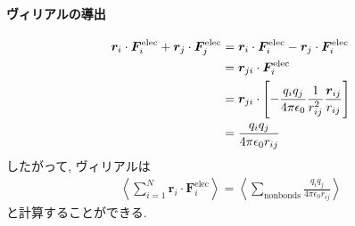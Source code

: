 \paragraph{ヴィリアルの導出}

\begin{align}
    \bm{r}_{i} \cdot \bm{F}_{i}^{\mathrm{elec}}
   +\bm{r}_{j} \cdot \bm{F}_{j}^{\mathrm{elec}}
 &=
    \bm{r}_{i} \cdot \bm{F}_{i}^{\mathrm{elec}}
   -\bm{r}_{j} \cdot \bm{F}_{i}^{\mathrm{elec}}
 \notag
 \\
 &=
    \bm{r}_{ji} \cdot \bm{F}_{i}^{\mathrm{elec}}
 \notag
 \\
 &=
    \bm{r}_{ji} \cdot
    \left[
          -\frac{q_{i}q_{j}}{4 \pi \epsilon_{0}}
           \frac{1}{r_{ij}^{2}}
           \frac{\bm{r}_{ij}}{r_{ij}}
    \right]
 \notag
 \\
 &=
   \frac{q_{i}q_{j}}{4 \pi \epsilon_{0} r_{ij}}
 \notag
\end{align}
したがって, ヴィリアルは
\begin{align}
   \left\langle
        \sum_{i=1}^{N} \bm{r}_{i} \cdot \bm{F}_{i}^{\mathrm{elec}}
   \right\rangle
 =
   \left\langle
        \sum_{\mathrm{nonbonds}}
        \frac{q_{i}q_{j}}{4 \pi \epsilon_{0} r_{ij}}
   \right\rangle
\end{align}
と計算することができる. 
\clearpage




